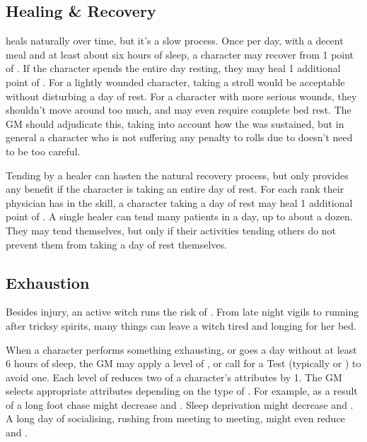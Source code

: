 \subsection{Healing \& Recovery}

{\damage} heals naturally over time, but it's a slow process.
Once per day, with a decent meal and at least about six hours of sleep, a character may recover from 1 point of {\damage}.
If the character spends the entire day resting, they may heal 1 additional point of {\damage}.
For a lightly wounded character, taking a stroll would be acceptable without disturbing a day of rest.
For a character with more serious wounds, they shouldn't move around too much, and may even require complete bed rest.
The GM should adjudicate this, taking into account how the {\damage} was sustained, but in general a character who is not suffering any penalty to rolls due to {\damage} doesn't need to be too careful.

Tending by a healer can hasten the natural recovery process, but only provides any benefit if the character is taking an entire day of rest.
For each rank their physician has in the  skill, a character taking a day of rest may heal 1 additional point of {\damage}.
A single healer can tend many patients in a day, up to about a dozen.
They may tend themselves, but only if their activities tending others do not prevent them from taking a day of rest themselves.

\subsection{Exhaustion}

Besides injury, an active witch runs the risk of {\exhaustion}.
From late night vigils to running after tricksy spirits, many things can leave a witch tired and longing for her bed.

When a character performs something exhausting, or goes a day without at least 6 hours of sleep, the GM may apply a level of {\exhaustion}, or call for a Test (typically  or ) to avoid one.
Each level of {\exhaustion} reduces two of a character's attributes by 1.
The GM selects appropriate attributes depending on the type of {\exhaustion}.
For example, {\exhaustion} as a result of a long foot chase might decrease  and .
Sleep deprivation might decrease  and .
A long day of socialising, rushing from meeting to meeting, might even reduce  and .

